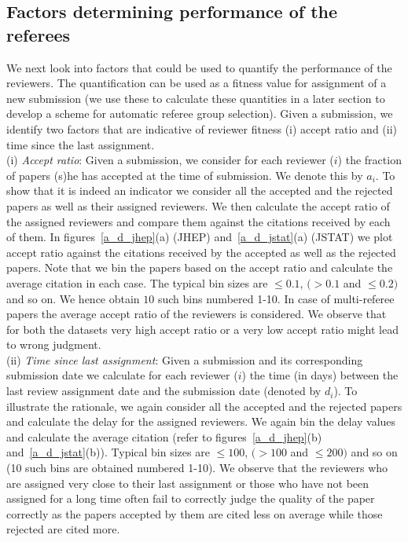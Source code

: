 \subsection{Factors determining performance of the referees}
We next look into factors that could be used to quantify the performance of the reviewers. The quantification can be used as a 
fitness value for assignment of a new submission (we use these to calculate these quantities in a later section to develop a scheme for automatic referee group selection). 
Given a submission, we identify two factors that are indicative of reviewer fitness (i) accept ratio and (ii) time since the last assignment.\\
\noindent(i) \textit{Accept ratio}: Given a submission, we consider for each reviewer ($i$) the fraction of papers (s)he has accepted at the time of submission. 
We denote this by $a_i$. To show that it is indeed an indicator we consider all the accepted and the rejected papers as well as their assigned reviewers. 
We then calculate the accept ratio of the assigned reviewers and compare them against the citations received by each of them. 
In figures~\ref{a_d_jhep}(a) (JHEP) and~\ref{a_d_jstat}(a) (JSTAT) we plot accept ratio against the citations received by the accepted as well as the rejected papers. 
Note that we bin the papers based on the accept ratio and calculate the average citation in each case. The typical bin sizes are $\leq 0.1$, $(> 0.1$ and $\leq 0.2)$ and so on. 
We hence obtain $10$ such bins numbered 1-10. 
In case of multi-referee papers the average accept ratio of the reviewers is considered. We observe that for both the datasets very high accept ratio or a very low accept 
ratio might lead to wrong judgment. \\ 
\noindent(ii) \textit{Time since last assignment}: Given a submission and its corresponding submission date we calculate for each reviewer ($i$) the time (in days) between the 
last review assignment date and the submission date (denoted by $d_i$). To illustrate the rationale, we again consider all the accepted and the rejected papers and calculate 
the delay for the assigned reviewers. We again bin the delay values and calculate the average citation (refer to figures~\ref{a_d_jhep}(b) and~\ref{a_d_jstat}(b)). Typical bin 
sizes are $\leq 100$, $(> 100$ and $\leq 200)$ and so on (10 such bins are obtained numbered 1-10). We observe that the reviewers who are assigned very close to their last 
assignment or those who have not been assigned for a long time often fail to correctly judge the quality of the paper correctly as the papers accepted by them are cited less 
on average while those rejected are cited more. 


